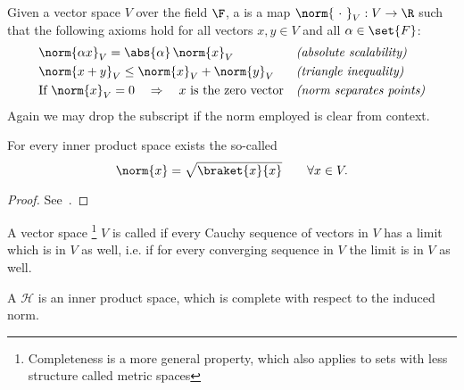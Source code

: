 \begin{defn}
	Given a vector space $V$ over the field $\F$, a  is a map
	$\norm{~\cdot~}_V : V \to \R$
	such that the following axioms hold for all vectors $x,y \in V$ and all $\alpha \in \set{F}$:
	\begin{align}
		\label{eqn:normScalability}
			&\norm{\alpha x}_V = \abs{\alpha} \, \norm{x}_V &&
			\text{\textit{(absolute scalability)}} \\
		\label{eqn:normTriaIneq}
			&\norm{x + y}_V \le \norm{x}_V + \norm{y}_V &&
			\text{\textit{(triangle inequality)}} \\
		\label{eqn:normPointSep}
			&\text{If}~\norm{x}_V = 0 \quad \Rightarrow
			\quad \text{$x$ is the zero vector} &&
			\text{\textit{(norm separates points)}}
	\end{align}
	Again we may drop the subscript if the norm employed is clear from context.
\end{defn}

\begin{prop}
	For every inner product space exists the so-called 
	\begin{equation}
		\norm{x} = \sqrt{ \braket{x}{x} } \qquad \forall x \in V.
		\label{eqn:normInduced}
	\end{equation}
	\begin{proof}
		See~\cite{DiracNotation}.
	\end{proof}
\end{prop}

\begin{defn}
	A vector space%
	\footnote{Completeness is a more general property,
		which also applies to sets with less structure
		called metric spaces}
	$V$ is called  if every Cauchy sequence
	of vectors in $V$ has a limit which is in $V$ as well,
	i.e. if for every converging sequence in $V$ the limit
	is in $V$ as well.
\end{defn}

\begin{defn}
	A  $\mathcal{H}$ is an inner product space,
	which is complete with respect to the induced norm.
\end{defn}

